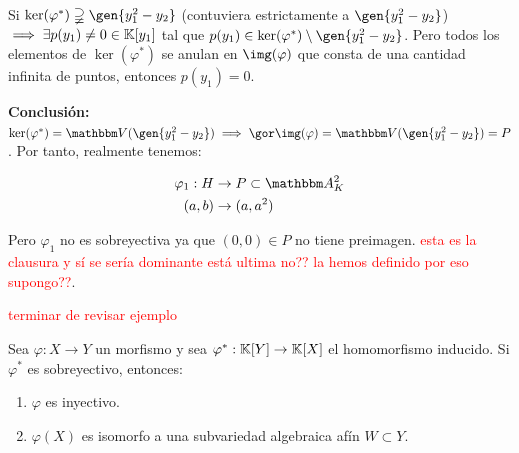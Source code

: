 \begin{example}
	Si $\ker(\varphi^*) \supsetneqq \gen{y_1^2-y_2}$ (contuviera estrictamente a $\gen{y_1^2-y_2}$) $\implies \exists p(y_1)\neq 0 \in \mathbb{K}[y_1]$ tal que $p(y_1) \in \ker(\varphi^*) \setminus \gen{y_1^2 - y_2}$. Pero todos los elementos de $\ker(\varphi^*)$ se anulan en $\img(\varphi)$ que consta de una cantidad infinita de puntos, entonces $p(y_1)=0$.

	\textbf{Conclusión: }$ \ker(\varphi^*)=\V(\gen{y_1^2-y_2}) \implies \cls{\img(\varphi)}= \V(\gen{y_1^2-y_2})=P$. Por tanto, realmente tenemos:

	\begin{align*}
		\varphi_1: H & \rightarrow P \subset \A^2_K\\
		(a,b) & \rightarrow (a,a^2)
	\end{align*}

	Pero $\varphi_1$ no es sobreyectiva ya que $(0,0) \in P$ no tiene preimagen. \textcolor{red}{esta es la clausura y sí se sería dominante está ultima no?? la hemos definido por eso supongo??}.

	\textcolor{red}{terminar de revisar ejemplo}
\end{example}

\begin{lemma}
	Sea $\varphi: X \rightarrow Y$ un morfismo y sea $\varphi^*: \mathbb{K}[Y]\rightarrow \mathbb{K}[X]$ el homomorfismo inducido. Si $\varphi^*$ es sobreyectivo, entonces:
		\begin{enumerate}
			\item $\varphi$ es inyectivo.
			\item $\varphi(X)$ es isomorfo a una subvariedad algebraica afín $W \subset Y$.
		\end{enumerate}
\end{lemma}

